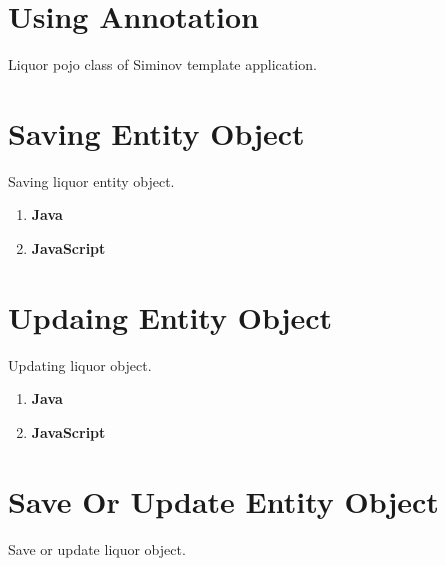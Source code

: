 \section{Using Annotation}
Liquor pojo class of Siminov template application.

	


\section{Saving Entity Object}
Saving liquor entity object.

	\begin{enumerate}

		\item \small \textbf{Java}
			

	
		\item \small \textbf{JavaScript}
			


	\end{enumerate}



\section{Updaing Entity Object}
Updating liquor object.

	\begin{enumerate}

		\item \small \textbf{Java}
			

	
		\item \small \textbf{JavaScript}
			

	\end{enumerate}



\section{Save Or Update Entity Object}
Save or update liquor object.

